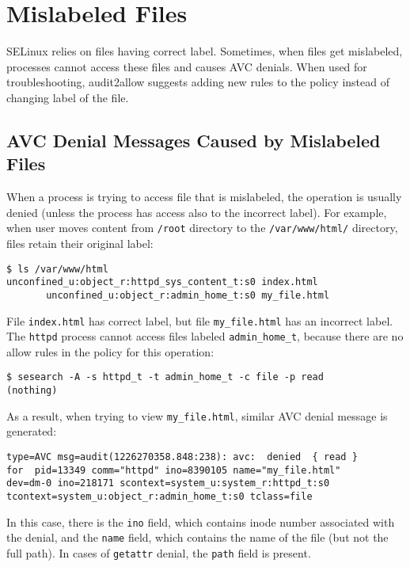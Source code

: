 \section{Mislabeled Files}
\label{mislabeled}
SELinux relies on files having correct label. Sometimes, when files get
mislabeled, processes cannot access these files and causes AVC denials. When
used for troubleshooting, audit2allow suggests adding new rules to the policy
instead of changing label of the file.

\subsection{AVC Denial Messages Caused by Mislabeled Files}
When a process is trying to access file that is mislabeled, the operation is
usually denied (unless the process has access also to the incorrect label). For
example, when user moves content from \texttt{/root} directory to the
\texttt{/var/www/html/} directory, files retain their original label:
\begin{lstlisting}
$ ls /var/www/html
unconfined_u:object_r:httpd_sys_content_t:s0 index.html
       unconfined_u:object_r:admin_home_t:s0 my_file.html
\end{lstlisting}
File \texttt{index.html} has correct label, but file \texttt{my\_file.html} has
an incorrect label. The \texttt{httpd} process cannot access files labeled
\texttt{admin\_home\_t}, because there are no allow rules in the policy for this
operation:
\begin{lstlisting}
$ sesearch -A -s httpd_t -t admin_home_t -c file -p read
(nothing)
\end{lstlisting}

As a result, when trying to view \texttt{my\_file.html}, similar AVC denial
message is generated:
\begin{lstlisting}
type=AVC msg=audit(1226270358.848:238): avc:  denied  { read }
for  pid=13349 comm="httpd" ino=8390105 name="my_file.html"
dev=dm-0 ino=218171 scontext=system_u:system_r:httpd_t:s0
tcontext=system_u:object_r:admin_home_t:s0 tclass=file
\end{lstlisting}
In this case, there is the \texttt{ino} field, which contains inode number
associated with the denial, and the \texttt{name} field, which contains the name
of the file (but not the full path). In cases of \texttt{getattr} denial, the
\texttt{path} field is present.

